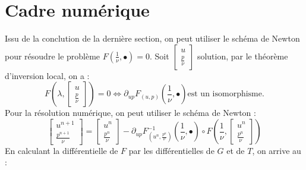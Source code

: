 \documentclass{book}
\begin{document}
\section{Cadre numérique}
Issu de la conclution de la dernière section, on peut utiliser le schéma de Newton pour résoudre le problème $F(\frac{1}{\nu},\bullet)=0$. Soit $\left[\begin{array}{ll}u\\ \frac{p}{\nu}\end{array}\right]$ solution, par le théorème d'inversion local, on a :
\[
F(\lambda,\left[\begin{array}{ll}u\\ \frac{p}{\nu}\end{array}\right])=0 \Longleftrightarrow
\partial_{up}F_{(u,p)}(\frac{1}{\nu},\bullet) \text{est un isomorphisme}.
\]
Pour la résolution numérique, on peut utiliser le schéma de Newton :
\[
\left[\begin{array}{ll}u^{n+1}\\ \frac{p^{n+1}}{\nu}\end{array}\right]=
\left[\begin{array}{ll}u^{n}\\ \frac{p^{n}}{\nu}\end{array}\right]-
\partial_{up}F^{-1}_{(u^n,\frac{p^n}{\nu})}(\frac{1}{\nu},\bullet) \circ
F(\frac{1}{\nu},\left[\begin{array}{ll}u^{n}\\ \frac{p^{n}}{\nu}\end{array}\right])
\]
En calculant la différentielle de $F$ par les différentielles de $G$ et de $T$, on arrive au :
\end{document}
